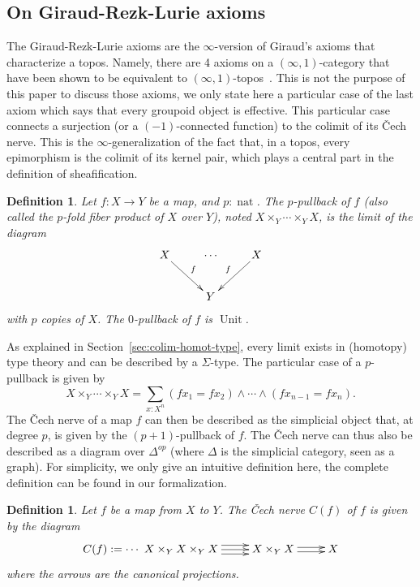 \documentclass[conference]{IEEEtran}
\makeatletter
\newtheorem{defi}[thm]{Definition}
\def\dar[#1]#2{\ar@<-#2>[#1]\ar@<#2>[#1]} %
\def\tar[#1]#2{\ar@<#2>[#1]\ar@<0pt>[#1]\ar@<-#2>[#1]} %
\DeclareMathOperator{\nat}{nat}
\DeclareMathOperator{\Unit}{Unit}
\makeatother
\begin{document}
\subsection{On Giraud-Rezk-Lurie axioms}
\label{sec:giraud-ax}

The Giraud-Rezk-Lurie axioms are the $\infty$-version of Giraud's
axioms that characterize a topos. Namely, there are 4 axioms on a
$(\infty,1)$-category that have been shown to be equivalent to
$(\infty,1)$-topos~\cite[Chapter 6]{lurie}. This is not the purpose of
this paper to discuss those axioms, we only state here a particular
case of the last axiom which says that every groupoid object is
effective.
%
This particular case connects a surjection (or a $(-1)$-connected
function) to the colimit of its \v{C}ech nerve.
%
This is the $\infty$-generalization of the fact that, in a topos,
every epimorphism is the colimit of its kernel pair, which plays a
central part in the definition of sheafification.

\begin{defi}
  Let $f:X \to Y$ be a map, and $p:\nat$. The $p$-pullback of $f$
  (also called the $p$-fold fiber product of $X$ over $Y$),
  noted $X\times_Y \cdots\times_Y X$, is
  the limit of the diagram
  $$\xymatrix{
    X \ar[rd]^f & \cdots & X \ar[ld]_f \\
      &    Y   &
  }$$
  with $p$ copies of $X$. The $0$-pullback of $f$ is $\Unit$.
\end{defi}

As explained in Section~\ref{sec:colim-homot-type}, every limit exists
in (homotopy) type theory and can be described by a $\Sigma$-type. 
%
The particular case of a $p$-pullback is given by
%
$$
X\times_Y \cdots\times_Y X = \sum_{x:X^n} (f x_1 = f x_2) \land
\cdots \land (f x_{n-1} = f x_n).
$$
%
The \v{C}ech nerve of a map $f$ can then be described as the
simplicial object that, at degree $p$, is given by the
$(p+1)$-pullback of $f$. The \v{C}ech nerve can thus also be described
as a diagram over $\Delta^{op}$ (where $\Delta$ is the simplicial
category, seen as a graph). For simplicity, we only give an intuitive
definition here, the complete definition can be found in our
formalization.
%
\begin{defi}
  Let $f$ be a map from $X$ to $Y$. The {\em \v{C}ech nerve} $C(f)$ of $f$
  is given by the diagram
  $$\xymatrix{
    C(f) := \cdots~ X \times_Y X \times_Y X \tar[r]{4pt} & X \times_Y X \dar[r]{2pt} & X
  }$$
where the arrows are the canonical projections.
\end{defi}
\end{document}
